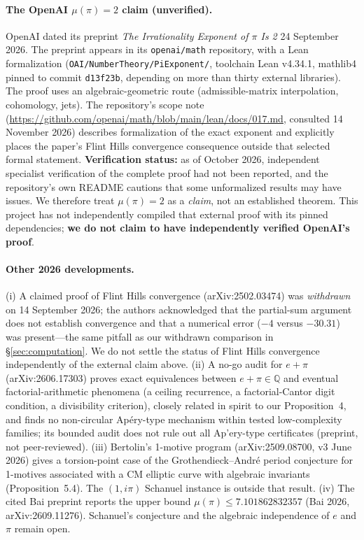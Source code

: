 \documentclass[11pt]{amsart}
\theoremstyle{definition}
\theoremstyle{remark}
\numberwithin{equation}{section}
\newcommand{\Q}{\mathbb{Q}}
\newcommand{\irr}{\mu}
\begin{document}
\paragraph{The OpenAI $\irr(\pi)=2$ claim (unverified).} OpenAI dated its preprint \emph{The Irrationality Exponent of $\pi$ Is 2} 24 September 2026. The preprint appears in its \texttt{openai/\allowbreak{}math} repository, with a Lean formalization (\texttt{OAI/\allowbreak{}NumberTheory/\allowbreak{}PiExponent/\allowbreak{}}, toolchain Lean v4.34.1, mathlib4 pinned to commit \texttt{d13f23b}, depending on more than thirty external libraries). The proof uses an algebraic-geometric route (admissible-matrix interpolation, cohomology, jets). The repository's scope note (\url{https://github.com/openai/math/blob/main/lean/docs/017.md}, consulted 14 November 2026) describes formalization of the exact exponent and explicitly places the paper's Flint Hills convergence consequence outside that selected formal statement. \textbf{Verification status:} as of October 2026, independent specialist verification of the complete proof had not been reported, and the repository's own README cautions that some unformalized results may have issues. We therefore treat $\irr(\pi)=2$ as a \emph{claim}, not an established theorem. This project has not independently compiled that external proof with its pinned dependencies; \textbf{we do not claim to have independently verified OpenAI's proof}.

\paragraph{Other 2026 developments.} (i) A claimed proof of Flint Hills convergence (arXiv:2502.03474) was \emph{withdrawn} on 14 September 2026; the authors acknowledged that the partial-sum argument does not establish convergence and that a numerical error ($-4$ versus $-30.31$) was present---the same pitfall as our withdrawn comparison in \S\ref{sec:computation}. We do not settle the status of Flint Hills convergence independently of the external claim above. (ii) A no-go audit for $e+\pi$ (arXiv:2606.17303) proves exact equivalences between $e+\pi\in\Q$ and eventual factorial-arithmetic phenomena (a ceiling recurrence, a factorial-Cantor digit condition, a divisibility criterion), closely related in spirit to our Proposition~4, and finds no non-circular Ap\'ery-type mechanism within tested low-complexity families; its bounded audit does not rule out all Ap'ery-type certificates (preprint, not peer-reviewed). (iii) Bertolin's 1-motive program (arXiv:2509.08700, v3 June 2026) \cite{BertolinMotives} gives a torsion-point case of the Grothendieck--Andr\'e period conjecture for 1-motives associated with a CM elliptic curve with algebraic invariants (Proposition~5.4). The $(1,i\pi)$ Schanuel instance is outside that result. (iv) The cited Bai preprint reports the upper bound $\irr(\pi)\le 7.101862832357$ (Bai 2026, arXiv:2609.11276). Schanuel's conjecture and the algebraic independence of $e$ and $\pi$ remain open.
\end{document}
